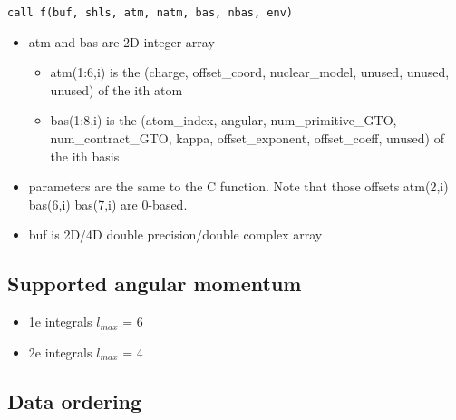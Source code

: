 \documentclass{article}
\begin{document}
\begin{verbatim}
call f(buf, shls, atm, natm, bas, nbas, env)
\end{verbatim}
\begin{itemize}
\item
  atm and bas are 2D integer array
  \begin{itemize}
  \item
    atm(1:6,i) is the (charge, offset\_coord, nuclear\_model, unused,
    unused, unused) of the ith atom
  \item
    bas(1:8,i) is the (atom\_index, angular, num\_primitive\_GTO,
    num\_contract\_GTO, kappa, offset\_exponent, offset\_coeff, unused)
    of the ith basis
  \end{itemize}
\item
  parameters are the same to the C function. Note that those offsets
  atm(2,i) bas(6,i) bas(7,i) are 0-based.
\item
  buf is 2D/4D double precision/double complex array
\end{itemize}
\subsection{Supported angular momentum}

\begin{itemize}
\item
  1e integrals $l_{max}$ = 6
\item
  2e integrals $l_{max}$ = 4
\end{itemize}
\subsection{Data ordering}
\end{document}
